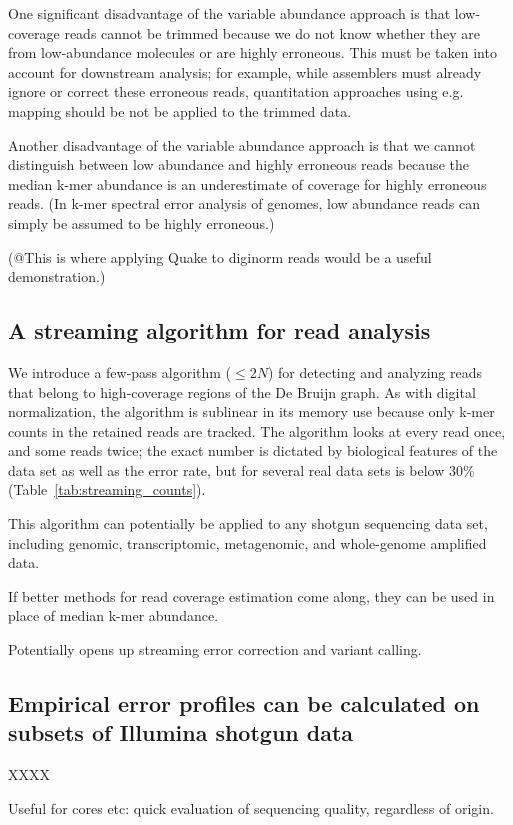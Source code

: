 \documentclass{article}
\begin{document}
One significant disadvantage of the variable abundance approach is
that low-coverage reads cannot be trimmed because we do not know
whether they are from low-abundance molecules or are highly erroneous.
This must be taken into account for downstream analysis; for example,
while assemblers must already ignore or correct these erroneous reads,
quantitation approaches using e.g. mapping should be not be applied
to the trimmed data.

Another disadvantage of the variable abundance approach is that we cannot
distinguish between low abundance and highly erroneous reads because the
median k-mer abundance is an underestimate of coverage for highly erroneous
reads.  (In k-mer spectral error analysis of genomes, low abundance reads
can simply be assumed to be highly erroneous.)

(@This is where applying Quake to diginorm reads would be a useful demonstration.)

\subsection{A streaming algorithm for read analysis}

We introduce a few-pass algorithm ($\leq 2N$) for detecting and
analyzing reads that belong to high-coverage regions of the De Bruijn
graph.  As with digital normalization, the algorithm is sublinear in
its memory use because only k-mer counts in the retained reads are
tracked.  The algorithm looks at every read once, and some reads
twice; the exact number is dictated by biological features of the
data set as well as the error rate, but for several real data sets is below
30\% (Table~\ref{tab:streaming_counts}).

This algorithm can potentially be applied to any shotgun sequencing
data set, including genomic, transcriptomic, metagenomic, and
whole-genome amplified data.

If better methods for read coverage estimation come along, they can be
used in place of median k-mer abundance.

Potentially opens up streaming error correction and variant calling.

\subsection{Empirical error profiles can be calculated on subsets of Illumina shotgun data}

XXXX

Useful for cores etc: quick evaluation of sequencing quality, regardless
of origin.
\end{document}
